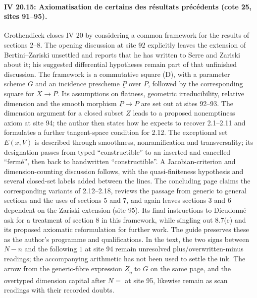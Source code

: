 \paragraph{IV 20.15: Axiomatisation de certains des résultats précédents (cote 25, sites 91--95).}
Grothendieck closes IV 20 by considering a common framework for the results of sections 2--8. The opening discussion at site 92 explicitly leaves the extension of Bertini--Zariski unsettled and reports that he has written to Serre and Zariski about it; his suggested differential hypotheses remain part of that unfinished discussion. The framework is a commutative square (D), with a parameter scheme $G$ and an incidence prescheme $\underline P$ over $P$, followed by the corresponding square for $X\to P$. Its assumptions on flatness, geometric irreducibility, relative dimension and the smooth morphism $\underline P\to P$ are set out at sites 92--93. The dimension argument for a closed subset $Z$ leads to a proposed nonemptiness axiom at site 94; the author then states how he expects to recover 2.1--2.11 and formulates a further tangent-space condition for 2.12. The exceptional set $E(x,V)$ is described through smoothness, nonramification and transversality; its designation passes from typed ``constructible'' to an inserted and cancelled ``fermé'', then back to handwritten ``constructible''. A Jacobian-criterion and dimension-counting discussion follows, with the quasi-finiteness hypothesis and several closed-set labels added between the lines. The concluding page claims the corresponding variants of 2.12--2.18, reviews the passage from generic to general sections and the uses of sections 5 and 7, and again leaves sections 3 and 6 dependent on the Zariski extension (site 95). Its final instructions to Dieudonné ask for a treatment of section 8 in this framework, while singling out 8.7(c) and its proposed axiomatic reformulation for further work. The guide preserves these as the author's programme and qualifications. In the text, the two signs between $N-n$ and the following $1$ at site 94 remain unresolved plus/overwritten-minus readings; the accompanying arithmetic has not been used to settle the ink. The arrow from the generic-fibre expression $\underline Z_\eta$ to $G$ on the same page, and the overtyped dimension capital after $N=$ at site 95, likewise remain as scan readings with their recorded doubts.
